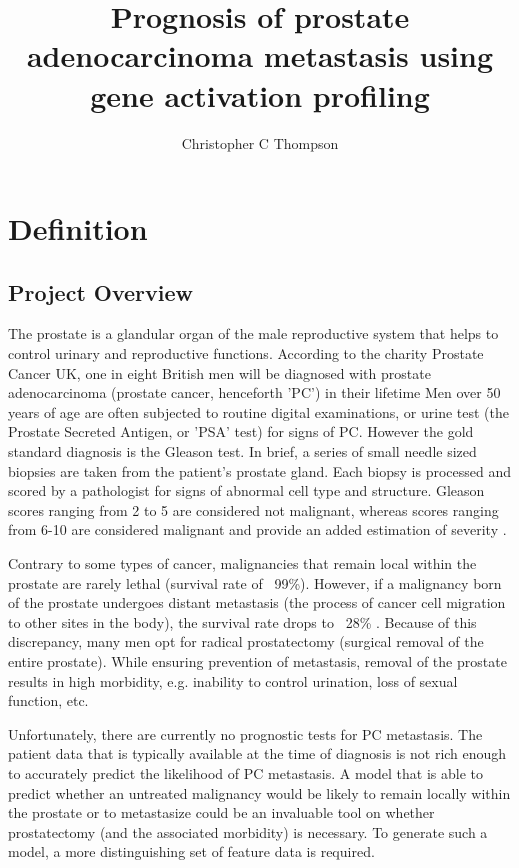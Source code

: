\documentclass[final]{article}
\title{Prognosis of prostate adenocarcinoma metastasis using gene activation profiling}
\author{Christopher C Thompson}
\begin{document}
\maketitle

\section{Definition}

\subsection{Project Overview}

The prostate is a glandular organ of the male reproductive system that helps to
control urinary and reproductive functions.  According to the charity Prostate
Cancer UK, one in eight British men will  be diagnosed with prostate
adenocarcinoma (prostate cancer, henceforth 'PC') in their  lifetime \cite{PCUK}
Men over 50 years of age are often subjected to routine digital examinations, or
urine test (the Prostate Secreted Antigen, or 'PSA' test) for signs of PC.  However the gold standard
diagnosis is the Gleason test.  In brief, a series of small needle sized
biopsies are taken from the patient's prostate gland.  Each biopsy is processed
and scored by a pathologist for signs of abnormal cell type and
structure.  Gleason scores ranging from 2 to 5 are considered not
malignant, whereas scores ranging from 6-10 are considered malignant and provide
an added estimation of severity \cite{Humphrey04}.

Contrary to some types of cancer, malignancies that remain local within the
prostate are rarely lethal (survival rate of ~99\%).  However, if a malignancy
born of the prostate undergoes distant metastasis (the process of cancer cell
migration to other sites in the body), the survival rate drops to ~28\% \cite{CancerOrg}.
Because of this discrepancy, many men opt for radical prostatectomy (surgical
removal of the entire prostate).  While ensuring prevention of metastasis,
removal of the prostate results in high morbidity, e.g. inability to control
urination, loss of sexual function, etc.

Unfortunately, there are currently no prognostic tests for PC metastasis.  The
patient data  that is typically available at the time of diagnosis is not rich
enough to accurately predict the likelihood of PC metastasis.   A
model that is able to predict whether an untreated malignancy would be likely to
remain locally within the prostate or to metastasize could be an invaluable tool
on whether prostatectomy (and the associated morbidity) is necessary.  To
generate such a model, a more distinguishing set of feature data is required.
\end{document}
